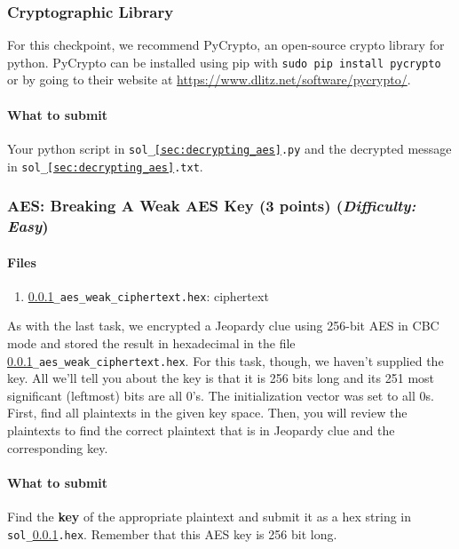 \documentclass[letterpaper,12pt]{report}
\begin{document}
\smallskip

\subsubsection*{Cryptographic Library}
For this checkpoint, we recommend PyCrypto, an open-source crypto library for python.  PyCrypto can be installed using pip with \texttt{sudo pip install pycrypto} or by going to their website at \url{https://www.dlitz.net/software/pycrypto/}.  


\noindent

\paragraph{What to submit}

Your python script in {\tt sol\_\ref{sec:decrypting_aes}.py} and the decrypted message in {\tt sol\_\ref{sec:decrypting_aes}.txt}.

\subsubsection{AES: Breaking A Weak AES Key (3 points)  \hfill\rm\normalsize (\emph{Difficulty: Easy})}
\label{sec:weak_aes}
\paragraph{Files}

\begin{enumerate}
\item {\tt \ref{sec:weak_aes}\_aes\_weak\_ciphertext.hex}: ciphertext
\end{enumerate}

As with the last task, we encrypted a Jeopardy clue using 256-bit AES in CBC mode and stored the result in hexadecimal in the file {\tt \ref{sec:weak_aes}\_aes\_weak\_ciphertext.hex}. For this task, though, we haven't supplied the key. All we'll tell you about the key is that it is 256 bits long and its 251 most significant (leftmost) bits are all 0's. The initialization vector was set to all 0s. First, find all plaintexts in the given key space. Then, you will review the plaintexts to find the correct plaintext that is in Jeopardy clue and the corresponding key.  
\smallskip
\noindent

\paragraph{What to submit}
Find the \textbf{key} of the appropriate plaintext and submit it as a hex string in {\tt sol\_\ref{sec:weak_aes}.hex}.  Remember that this AES key is 256 bit long.
\end{document}
